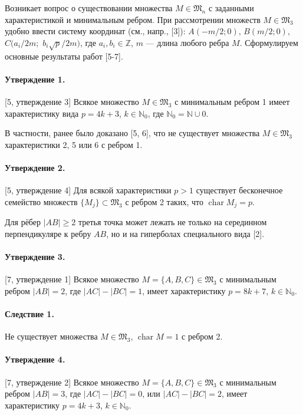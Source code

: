 Возникает вопрос о существовании множества $M\in\mathfrak{M}_n$
с заданными характеристикой и минимальным ребром. При рассмотрении множеств $M \in \mathfrak{M}_{3}$ удобно ввести систему координат (см., напр., [3]):
 $A(-m/2;0)$, $B(m/2;0)$,
$C(a_i/2m;$ $b_i \sqrt{p}/2m)$, где $a_i, b_i \in \mathbb{Z}$, $m$ --- длина любого ребра $M$.
Сформулируем основные результаты работ [5-7].



\paragraph{Утверждение 1.} [5, утверждение 3]
Всякое множество $M \in \mathfrak{M}_{3}$ с минимальным ребром 1 имеет характеристику вида
$p=4k+3$, $k\in\mathbb{N}_{0}$, где $ \mathbb{N}_{0}=\mathbb{N} \cup 0$.

В частности, ранее было доказано [5, 6], что не существует множества  $M \in \mathfrak{M}_{3}$ характеристики 2, 5 или 6 с ребром 1.



\paragraph{Утверждение 2.} [5, утверждение 4]
Для всякой характеристики $p>1$ существует бесконечное семейство множеств $\{M_j\}\subset\mathfrak{M}_3$ с ребром 2
таких, что $\operatorname{char}M_j = p$.

Для рёбер $|AB| \geq 2$ третья точка может лежать не только на серединном перпендикуляре к ребру $AB$, но и на гиперболах специального вида [2].

\paragraph{Утверждение 3.} [7, утверждение 1]
Всякое множество $M=\{A, B, C\} \in \mathfrak{M}_{3}$ с минимальным ребром $|AB|=2$, где $|AC|-|BC|=1$, имеет характеристику $p=8k+7$, $k\in\mathbb{N}_{0}$.

\paragraph{Следствие 1.}
Не существует множества $M \in \mathfrak{M}_{3}$,  $\operatorname{char} M = 1$ с ребром 2.

\paragraph{Утверждение 4.} [7, утверждение 2]
Всякое множество $M=\{A, B, C\} \in \mathfrak{M}_{3}$ с минимальным ребром $|AB|=3$, где $|AC|-|BC|=0$, или $|AC|-|BC|=2$, имеет характеристику $p=4k+3$, $k\in\mathbb{N}_{0}$.

